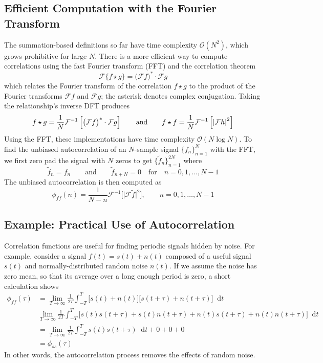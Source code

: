 \documentclass[11pt, a4paper]{article}
\newcommand{\diff}{\mathop{}\!\mathrm{d}} %
\newcommand{\F}{\mathcal{F}} %
\newcommand{\eqtext}[1]{\qquad \text{#1} \qquad}
\begin{document}
\subsection{Efficient Computation with the Fourier Transform}
The summation-based definitions so far have time complexity $ \mathcal{O}(N^{2}) $, which grows prohibitive for large $ N $.  There is a more efficient way to compute correlations using the fast Fourier transform (FFT) and the correlation theorem
\begin{equation*}
	\F\{f \star g\} = \big(\F f\big)^{*} \cdot \F g
\end{equation*}
which relates the Fourier transform of the correlation $ f \star g $ to the product of the Fourier transforms $ \F f $ and $ \F g $; the asterisk denotes complex conjugation. Taking the relationship's inverse DFT produces
\begin{equation}
	f \star g = \frac{1}{N}\F^{-1}\left [\big(\F f\big)^{*} \cdot \F g\right ] \eqtext{and} f \star f = \frac{1}{N}\F^{-1}\left [ \abs{\F h}^{2} \right] \label{fft:eq:cor-fft-biased} 
\end{equation}
Using the FFT, these implementations have time complexity $ \mathcal{O}(N\log N) $. To find the unbiased autocorrelation of an $ N $-sample signal $ \{f_{n}\}_{n=1}^{N} $ with the FFT, we first zero pad the signal with $ N $ zeros to get $ \{\tilde{f}_{n}\}_{n=1}^{2N} $ where
\begin{equation*}
	\tilde{f}_{n} = f_{n} \eqtext{and} \tilde{f}_{n+N} = 0 \quad \text{for} \quad  n = 0, 1, \ldots, N-1
\end{equation*}
The unbiased autocorrelation is then computed as
\begin{equation}
	\phi_{ff}(n) = \frac{1}{N-n}\F^{-1}\big[\big|\F \tilde{f}\big|^{2}\big], \qquad n = 0, 1, \ldots, N-1 \label{fft:eq:cor-fft-unbiased} 
\end{equation}


\subsection{Example: Practical Use of Autocorrelation}
Correlation functions are useful for finding periodic signals hidden by noise. For example, consider a signal $ f(t) = s(t) + n(t) $ composed of a useful signal $ s(t) $ and normally-distributed random noise $ n(t) $. If we assume the noise has zero mean, so that its average over a long enough period is zero, a short calculation shows
\begin{align}
	\phi_{ff}(\tau) &= \lim_{T \to \infty}\frac{1}{2T}\int_{-T}^{T}\big[s(t) + n(t)\big]\big[s(t + \tau) + n(t + \tau)\big] \diff t \nonumber \\
	&\lim_{T \to \infty}\frac{1}{2T}\int_{-T}^{T}\big [s(t)s(t + \tau) + s(t)n(t + \tau) + n(t)s(t + \tau) + n(t)n(t + \tau)\big ] \diff t \nonumber \\
	&= \lim_{T \to \infty}\frac{1}{2T}\int_{-T}^{T} s(t)s(t + \tau)\diff t + 0 + 0 + 0 \nonumber \\
	&= \phi_{ss}(\tau) \label{fft:eq:autocor-noise-removal}
\end{align}
In other words, the autocorrelation process removes the effects of random noise. 
\end{document}

